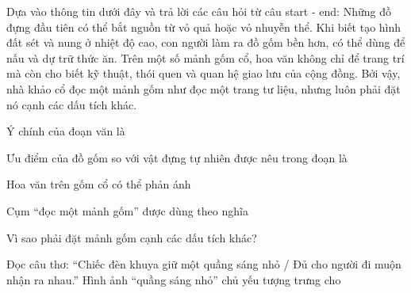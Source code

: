 \begin{baidoc}
\item[] Dựa vào thông tin dưới đây và trả lời các câu hỏi từ câu {start} - {end}:
Những đồ đựng đầu tiên có thể bắt nguồn từ vỏ quả hoặc vỏ nhuyễn thể. Khi biết tạo hình đất sét và nung ở nhiệt độ cao, con người làm ra đồ gốm bền hơn, có thể dùng để nấu và dự trữ thức ăn. Trên một số mảnh gốm cổ, hoa văn không chỉ để trang trí mà còn cho biết kỹ thuật, thói quen và quan hệ giao lưu của cộng đồng. Bởi vậy, nhà khảo cổ đọc một mảnh gốm như đọc một trang tư liệu, nhưng luôn phải đặt nó cạnh các dấu tích khác.

\begin{ex}
Ý chính của đoạn văn là
\end{ex}

\begin{ex}
Ưu điểm của đồ gốm so với vật đựng tự nhiên được nêu trong đoạn là
\end{ex}

\begin{ex}
Hoa văn trên gốm cổ có thể phản ánh
\end{ex}

\begin{ex}
Cụm “đọc một mảnh gốm” được dùng theo nghĩa
\end{ex}

\begin{ex}
Vì sao phải đặt mảnh gốm cạnh các dấu tích khác?
\end{ex}
\end{baidoc}

\begin{ex}
Đọc câu thơ: “Chiếc đèn khuya giữ một quầng sáng nhỏ / Đủ cho người đi muộn nhận ra nhau.” Hình ảnh “quầng sáng nhỏ” chủ yếu tượng trưng cho
\end{ex}

